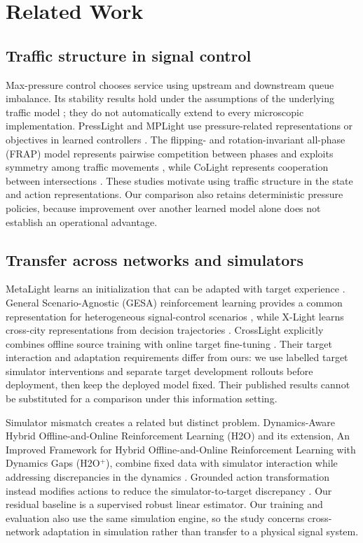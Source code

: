 \section{Related Work}
\subsection{Traffic structure in signal control}
Max-pressure control chooses service using upstream and downstream queue imbalance. Its stability results hold under the assumptions of the underlying traffic model \cite{varaiya2013maxpressure}; they do not automatically extend to every microscopic implementation. PressLight and MPLight use pressure-related representations or objectives in learned controllers \cite{wei2019presslight,chen2020thousandlights}. The flipping- and rotation-invariant all-phase (FRAP) model represents pairwise competition between phases and exploits symmetry among traffic movements \cite{zheng2019frap}, while CoLight represents cooperation between intersections \cite{wei2019colight}. These studies motivate using traffic structure in the state and action representations. Our comparison also retains deterministic pressure policies, because improvement over another learned model alone does not establish an operational advantage.

\subsection{Transfer across networks and simulators}
MetaLight learns an initialization that can be adapted with target experience \cite{zang2020metalight}. General Scenario-Agnostic (GESA) reinforcement learning provides a common representation for heterogeneous signal-control scenarios \cite{jiang2024gesa}, while X-Light learns cross-city representations from decision trajectories \cite{jiang2024xlight}. CrossLight explicitly combines offline source training with online target fine-tuning \cite{sun2024crosslight}. Their target interaction and adaptation requirements differ from ours: we use labelled target simulator interventions and separate target development rollouts before deployment, then keep the deployed model fixed. Their published results cannot be substituted for a comparison under this information setting.

Simulator mismatch creates a related but distinct problem. Dynamics-Aware Hybrid Offline-and-Online Reinforcement Learning (H2O) and its extension, An Improved Framework for Hybrid Offline-and-Online Reinforcement Learning with Dynamics Gaps (H2O$^+$), combine fixed data with simulator interaction while addressing discrepancies in the dynamics \cite{niu2022h2o,niu2023h2oplus}. Grounded action transformation instead modifies actions to reduce the simulator-to-target discrepancy \cite{da2023ugat}. Our residual baseline is a supervised robust linear estimator. Our training and evaluation also use the same simulation engine, so the study concerns cross-network adaptation in simulation rather than transfer to a physical signal system.

